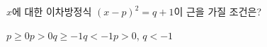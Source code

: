 $x$에 대한 이차방정식 $(x-p)^2=q+1$이 근을 가질 조건은? 
\begin{choices32}{$p\ge0$}{$p>0$}{$q\ge-1$}{$q<-1$}{$p>0$, $q<-1$}\end{choices32}
